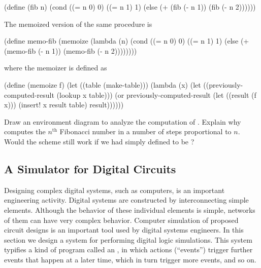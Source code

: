 \begin{exerciseGroup}
\begin{codeBlock}
(define (fib n)
  (cond ((= n 0) 0)
        ((= n 1) 1)
        (else (+ (fib (- n 1)) (fib (- n 2))))))
\end{codeBlock}

The memoized version of the same procedure is

\begin{codeBlock}
(define memo-fib
  (memoize
   (lambda (n)
     (cond ((= n 0) 0)
           ((= n 1) 1)
           (else (+ (memo-fib (- n 1))
                    (memo-fib (- n 2))))))))
\end{codeBlock}

\noindent
where the memoizer is defined as

\begin{codeBlock}
(define (memoize f)
  (let ((table (make-table)))
    (lambda (x)
      (let ((previously-computed-result
             (lookup x table)))
        (or previously-computed-result
            (let ((result (f x)))
              (insert! x result table)
              result))))))
\end{codeBlock}

Draw an environment diagram to analyze the computation of .
Explain why  computes the \( n^{\mathrm{th}} \) Fibonacci number in a number
of steps proportional to \( n \).  Would the scheme still work if we had simply
defined  to be ?
\end{exerciseGroup}

\subsection{A Simulator for Digital Circuits}
\label{Section 3.3.4}

Designing complex digital systems, such as computers, is an important
engineering activity.  Digital systems are constructed by interconnecting
simple elements.  Although the behavior of these individual elements is simple,
networks of them can have very complex behavior.  Computer simulation of
proposed circuit designs is an important tool used by digital systems
engineers.  In this section we design a system for performing digital logic
simulations.  This system typifies a kind of program called an
, in which actions (``events'') trigger
further events that happen at a later time, which in turn trigger more events,
and so on.

